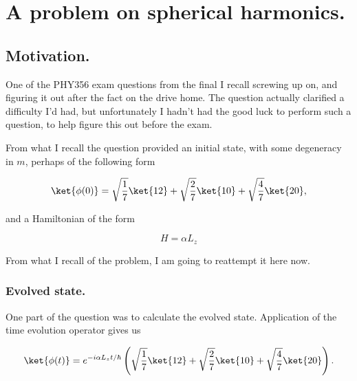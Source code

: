 
%

\chapter{A problem on spherical harmonics.}
\label{chap:qmIexam2010}
{}
\date{Jan 9, 2011}

\beginArtWithToc

\section{Motivation.}

One of the PHY356 exam questions from the final I recall screwing up on, and figuring it out after the fact on the drive home.  The question actually clarified a difficulty I'd had, but unfortunately I hadn't had the good luck to perform such a question, to help figure this out before the exam.

From what I recall the question provided an initial state, with some degeneracy in $m$, perhaps of the following form

\begin{equation}\label{eqn:qmIexam2010:10}
\ket{\phi(0)} = 
\sqrt{\frac{1}{7}} \ket{ 12 }
+\sqrt{\frac{2}{7}} \ket{ 10 }
+\sqrt{\frac{4}{7}} \ket{ 20 },
\end{equation}

and a Hamiltonian of the form

\begin{equation}\label{eqn:qmIexam2010:20}
H = \alpha L_z
\end{equation}

From what I recall of the problem, I am going to reattempt it here now.

\subsection{Evolved state.}

One part of the question was to calculate the evolved state.  Application of the time evolution operator gives us

\begin{equation}\label{eqn:qmIexam2010:30}
\ket{\phi(t)} = 
e^{-i \alpha L_z t/\hbar} \left(
\sqrt{\frac{1}{7}} \ket{ 12 }
+\sqrt{\frac{2}{7}} \ket{ 10 }
+\sqrt{\frac{4}{7}} \ket{ 20 } \right).
\end{equation}

